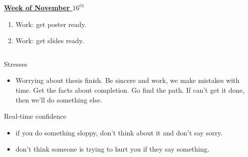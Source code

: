\documentclass[serif, mathserif, final]{beamer}
\begin{document}
{\begin{frame} {}
\begin{columns}
\begin{column}{0.27\linewidth}
\begin{block} {\small \underline{\textbf{Week of November $16^{th}$}} }
\begin{enumerate}
\tiny \item \tiny Work: get poster ready. 
\item \tiny Work: get slides ready.
\end{enumerate}
\end{block} 

\end{column}%
 \end{columns} 
\end{frame} 
}

\begin{frame}{} 
  \begin{columns}
\begin{column}{0.25\linewidth} %
  \begin{block}{Stresses}
    \begin{itemize} 
    \item \tiny Worrying about thesis finish. Be sincere and work, we make mistakes with time. Get the facts about completion.  Go find the path. If can't get it done, then we'll do something else.
    \end{itemize} 
  \end{block} 

  \begin{block}{Real-time confidence}
    \begin{itemize} 
      \tiny \item \tiny if you do something sloppy, don't think about it and don't say sorry. 
\item \tiny don't think someone is trying to hurt you if they say something. 
    \end{itemize} 
  \end{block} 


\end{column}
\end{columns}
\end{frame}
\end{document}
